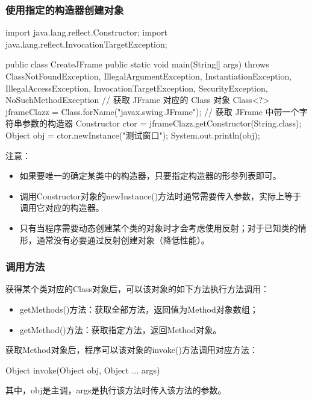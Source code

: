 \begin{frame}[fragile] %
\frametitle{使用指定的构造器创建对象}

\begin{javaCode}
import java.lang.reflect.Constructor;
import java.lang.reflect.InvocationTargetException;

public class CreateJFrame {
  public static void main(String[] args) throws ClassNotFoundException,
  IllegalArgumentException, InstantiationException,
  IllegalAccessException, InvocationTargetException,
  SecurityException, NoSuchMethodException {
    // 获取 JFrame 对应的 Class 对象
    Class<?> jframeClazz = Class.forName("javax.swing.JFrame");
    // 获取 JFrame 中带一个字符串参数的构造器
    Constructor ctor = jframeClazz.getConstructor(String.class);
    Object obj = ctor.newInstance("测试窗口");
    System.out.println(obj);
  }
}  
\end{javaCode}
注意：
\begin{itemize}\scriptsize
\item 如果要唯一的确定某类中的构造器，只要指定构造器的{\Red 形参列表}即可。
\item 调用Constructor对象的newInstance()方法时通常需要传入参数，实际上等于调用它对应的构造器。
\item 只有当程序需要动态创建某个类的对象时才会考虑使用反射；对于已知类的情形，通常没有必要通过反射创建对象（降低性能）。
\end{itemize}
\end{frame}

\begin{frame}[fragile] %
\frametitle{调用方法}

获得某个类对应的Class对象后，可以该对象的如下方法执行方法调用：
\begin{itemize}
\item getMethods()方法：获取全部方法，返回值为Method对象数组；
\item getMethod()方法：获取指定方法，返回Method对象。
\end{itemize}
获取Method对象后，程序可以该对象的invoke()方法调用对应方法：
\begin{javaCode}
Object invoke(Object obj, Object ... args)
\end{javaCode}
其中，obj是主调，args是执行该方法时传入该方法的参数。
\end{frame}

